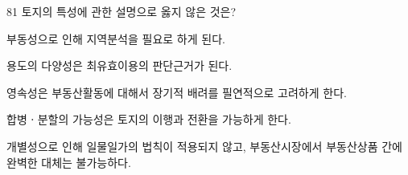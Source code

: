 \begin{question}{81}
토지의 특성에 관한 설명으로 옳지 않은 것은?
\begin{choices}
  \item 부동성으로 인해 지역분석을 필요로 하게 된다.
  \item 용도의 다양성은 최유효이용의 판단근거가 된다.
  \item 영속성은 부동산활동에 대해서 장기적 배려를 필연적으로 고려하게 한다.
  \item 합병ㆍ분할의 가능성은 토지의 이행과 전환을 가능하게 한다.
  \item 개별성으로 인해 일물일가의 법칙이 적용되지 않고, 부동산시장에서 부동산상품 간에 완벽한 대체는 불가능하다.
\end{choices}
\end{question}
